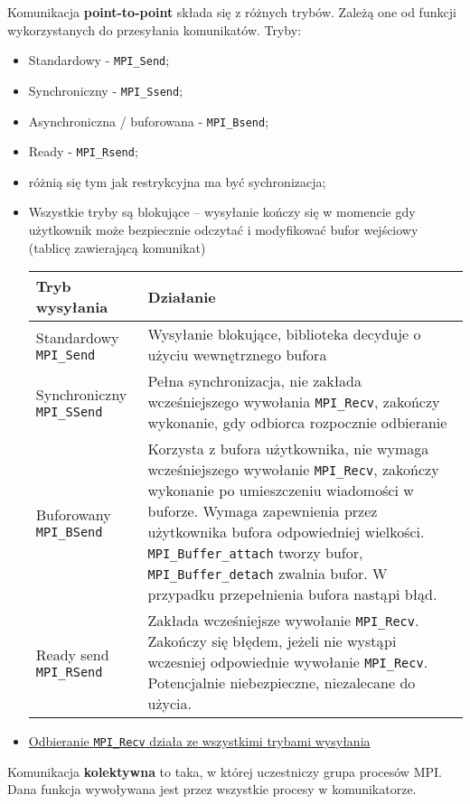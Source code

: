Komunikacja \textbf{point-to-point} składa się z różnych trybów. Zależą one od funkcji wykorzystanych do przesyłania komunikatów. Tryby:
\begin{itemize}
\item Standardowy - \texttt{MPI\_Send};
\item Synchroniczny - \texttt{MPI\_Ssend};
\item Asynchroniczna / buforowana - \texttt{MPI\_Bsend};
\item Ready - \texttt{MPI\_Rsend};
\item różnią się tym jak restrykcyjna ma być sychronizacja;
\item Wszystkie tryby są blokujące -- wysyłanie kończy się w momencie gdy użytkownik może bezpiecznie odczytać i modyfikować bufor wejściowy (tablicę zawierającą komunikat)
\begin{table}[H]
\begin{tabularx}{\textwidth}{|l|X|}\hline
\textbf{Tryb wysyłania} & \textbf{Działanie} \\ \hline
Standardowy \texttt{MPI\_Send} & Wysyłanie blokujące, biblioteka decyduje o użyciu wewnętrznego bufora \\ \hline
Synchroniczny \texttt{MPI\_SSend} & Pełna synchronizacja, nie zakłada wcześniejszego wywołania \texttt{MPI\_Recv}, zakończy wykonanie, gdy odbiorca rozpocznie odbieranie \\ \hline
Buforowany \texttt{MPI\_BSend} & Korzysta z bufora użytkownika, nie wymaga wcześniejszego wywołanie \texttt{MPI\_Recv}, zakończy wykonanie po umieszczeniu wiadomości w buforze. Wymaga zapewnienia przez użytkownika bufora odpowiedniej wielkości. \texttt{MPI\_Buffer\_attach} tworzy bufor, \texttt{MPI\_Buffer\_detach} zwalnia bufor. W przypadku przepełnienia bufora nastąpi błąd. \\ \hline
Ready send \texttt{MPI\_RSend} & Zakłada wcześniejsze wywołanie \texttt{MPI\_Recv}. Zakończy się błędem, jeżeli nie wystąpi wczesniej odpowiednie wywołanie \texttt{MPI\_Recv}. Potencjalnie niebezpieczne, niezalecane do użycia. \\ \hline
\end{tabularx}
\end{table}
\item \underline{Odbieranie \texttt{MPI\_Recv} działa ze wszystkimi trybami wysyłania}
\end{itemize}

Komunikacja \textbf{kolektywna} to taka, w której uczestniczy grupa procesów MPI. Dana funkcja wywoływana jest przez wszystkie procesy w komunikatorze. 


